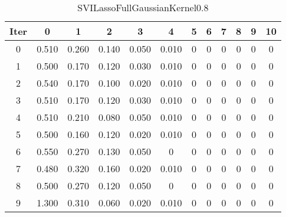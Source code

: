 \begin{table}
	\begin{center}
		\begin{tabular}{|c|c|c|c|c|c|c|c|c|c|c|c|}
			\hline
			Iter & 0 & 1 & 2 & 3 & 4 & 5 & 6 & 7 & 8 & 9 & 10 \\
			\hline
			0 & 0.510 & 0.260 & 0.140 & 0.050 & 0.010 & 0 & 0 & 0 & 0 & 0 & 0 \\
			\hline
			1 & 0.500 & 0.170 & 0.120 & 0.030 & 0.010 & 0 & 0 & 0 & 0 & 0 & 0 \\
			\hline
			2 & 0.540 & 0.170 & 0.100 & 0.020 & 0.010 & 0 & 0 & 0 & 0 & 0 & 0 \\
			\hline
			3 & 0.510 & 0.170 & 0.120 & 0.030 & 0.010 & 0 & 0 & 0 & 0 & 0 & 0 \\
			\hline
			4 & 0.510 & 0.210 & 0.080 & 0.050 & 0.010 & 0 & 0 & 0 & 0 & 0 & 0 \\
			\hline
			5 & 0.500 & 0.160 & 0.120 & 0.020 & 0.010 & 0 & 0 & 0 & 0 & 0 & 0 \\
			\hline
			6 & 0.550 & 0.270 & 0.130 & 0.050 & 0 & 0 & 0 & 0 & 0 & 0 & 0 \\
			\hline
			7 & 0.480 & 0.320 & 0.160 & 0.020 & 0.010 & 0 & 0 & 0 & 0 & 0 & 0 \\
			\hline
			8 & 0.500 & 0.270 & 0.120 & 0.050 & 0 & 0 & 0 & 0 & 0 & 0 & 0 \\
			\hline
			9 & 1.300 & 0.310 & 0.060 & 0.020 & 0.010 & 0 & 0 & 0 & 0 & 0 & 0 \\
			\hline
		\end{tabular}
	\end{center}
	\caption{SVILassoFullGaussianKernel0.8}
\end{table}